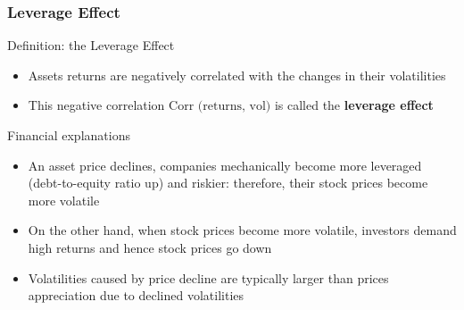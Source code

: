 \documentclass{beamer}
\begin{document}
\begin{frame}
  \frametitle{Leverage Effect}

  \begin{block}{Definition: the Leverage Effect}
    \begin{itemize}
    \item Assets returns are negatively correlated with the changes in their volatilities
    \item This negative correlation $\text{Corr (returns, vol)}$ is called the \textbf{leverage effect}
    \end{itemize}

Financial explanations
    \begin{itemize}
    \item An asset price declines, companies mechanically become more leveraged (debt-to-equity ratio up) and riskier: therefore, their stock prices become more volatile
    \item On the other hand, when stock prices become more volatile, investors demand high returns and hence stock prices go down
    \item Volatilities caused by price decline are typically larger than prices appreciation due to declined volatilities
    \end{itemize}
    
  \end{block}
  
\end{frame}
\end{document}
